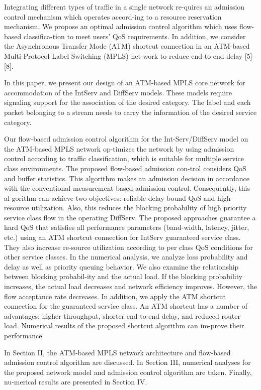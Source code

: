 \documentclass[10pt, twocolumn, twoside]{etri}
\begin{document}
Integrating different types of traffic in a single network re-quires
an admission control mechanism which operates accord-ing to a resource
reservation mechanism. We propose an optimal admission control algorithm
which uses flow-based classifica-tion to meet users' QoS requirements. In
addition, we consider the Asynchronous Transfer Mode (ATM) shortcut
connection in an ATM-based Multi-Protocol Label Switching (MPLS) net-work
to reduce end-to-end delay [5]-[8].

In this paper, we present our design of an ATM-based MPLS core network
for accommodation of the IntServ and DiffServ models. These models require
signaling support for the association of the desired category. The label
and each packet belonging to a stream needs to carry the information of
the desired service category.

Our flow-based admission control algorithm for the Int-Serv/DiffServ
model on the ATM-based MPLS network op-timizes the network by
using admission control according to traffic classification, which
is suitable for multiple service class environments. The proposed
flow-based admission con-trol considers QoS and buffer statistics. This
algorithm makes an admission decision in accordance with the conventional
measurement-based admission control. Consequently, this al-gorithm can
achieve two objectives: reliable delay bound QoS and high resource
utilization. Also, this reduces the blocking probability of high
priority service class flow in the operating DiffServ. The proposed
approaches guarantee a hard QoS that satisfies all performance parameters
(band-width, latency, jitter, etc.) using an ATM shortcut connection
for IntServ guaranteed service class. They also increase re-source
utilization according to per class QoS conditions for other service
classes. In the numerical analysis, we analyze loss probability and delay
as well as priority queuing behavior. We also examine the relationship
between blocking probabil-ity and the actual load. If the blocking
probability increases, the actual load decreases and network efficiency
improves. However, the flow acceptance rate decreases. In addition, we
apply the ATM shortcut connection for the guaranteed service class. An
ATM shortcut has a number of advantages: higher throughput, shorter
end-to-end delay, and reduced router load. Numerical results of the
proposed shortcut algorithm can im-prove their performance.

In Section II, the ATM-based MPLS network architecture and flow-based
admission control algorithm are discussed. In Section III, numerical
analyses for the proposed network model and admission control algorithm
are taken. Finally, nu-merical results are presented in Section IV.
\end{document}
